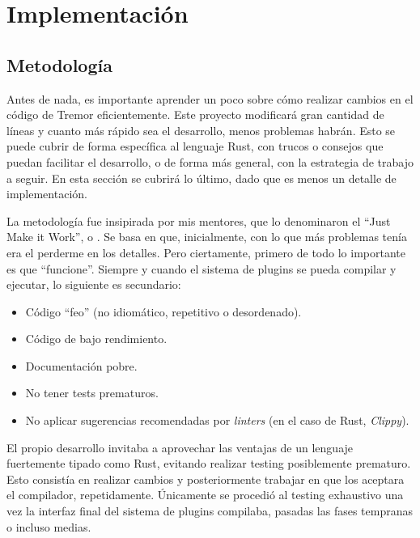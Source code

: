 
\chapter{Implementación}

\section{Metodología}

Antes de nada, es importante aprender un poco sobre cómo realizar cambios en el
código de Tremor eficientemente. Este proyecto modificará gran cantidad de
líneas y cuanto más rápido sea el desarrollo, menos problemas habrán. Esto se
puede cubrir de forma específica al lenguaje Rust, con trucos o consejos que
puedan facilitar el desarrollo, o de forma más general, con la estrategia de
trabajo a seguir. En esta sección se cubrirá lo último, dado que es menos un
detalle de implementación.

La metodología fue insipirada por mis mentores, que lo denominaron el ``Just
Make it Work'', o \work. Se basa en que, inicialmente, con lo que más problemas
tenía era el perderme en los detalles. Pero ciertamente, primero de todo lo
importante es que ``funcione''. Siempre y cuando el sistema de plugins se pueda
compilar y ejecutar, lo siguiente es secundario:

\begin{itemize}
    \item Código ``feo'' (no idiomático, repetitivo o desordenado).

    \item Código de bajo rendimiento.

    \item Documentación pobre.

    \item No tener tests prematuros.

    \item No aplicar sugerencias recomendadas por \emph{linters} (en el caso de
        Rust, \emph{Clippy}).

\end{itemize}

El propio desarrollo invitaba a aprovechar las ventajas de un lenguaje
fuertemente tipado como Rust, evitando realizar testing posiblemente prematuro.
Esto consistía en realizar cambios y posteriormente trabajar en que los aceptara
el compilador, repetidamente. Únicamente se procedió al testing exhaustivo una
vez la interfaz final del sistema de plugins compilaba, pasadas las fases
tempranas o incluso medias.

